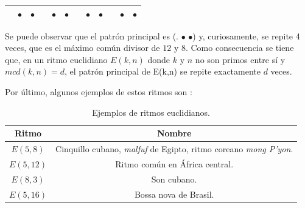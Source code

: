 \documentclass[a4paper, openright, 11pt, titlepage]{report}
\theoremstyle{definition}\newtheorem{defin}[propo]{Definition}
\theoremstyle{definition}\newtheorem{obser}[propo]{Remark}
\theoremstyle{definition}\newtheorem{ejem}[propo]{Ejemplo}
\theoremstyle{definition}\newtheorem{algoritmo}[propo]{Algoritmo}
\begin{document}
\begin{enumerate}
    \begin{table}[H]
        \centering
        \begin{tabular}{|c|c|c|c|c|c|c|c|c|c|c|c|}
        \hline
            & $\bullet$ & $\bullet$ & & $\bullet$ & $\bullet$ & & $\bullet$ & $\bullet$ & &$\bullet$ & $\bullet$\\
            \hline
        \end{tabular}
    \end{table}
    Se puede observar que el patrón principal es (\hspace{0.1cm}. \hspace{0.1cm} $\bullet$ \hspace{0.1cm} $\bullet$) y, curiosamente, se repite 4 veces, que es el máximo común divisor de $12$ y $8$. Como consecuencia se tiene que, en un ritmo euclidiano $E(k,n)$ donde $k$ y $n$ no son primos entre sí y $mcd(k,n) = d$, el patrón principal de E(k,n) se repite exactamente $d$ veces.
\end{enumerate}
Por último, algunos ejemplos de estos ritmos son \cite{ritmos}:
\begin{table}[H]
    \centering
    \begin{tabular}{|c|c|}
    \hline
      Ritmo   &  Nombre\\
      \hline \hline
      $E(5,8)$ & Cinquillo cubano, \textit{malfuf} de Egipto, ritmo coreano \textit{mong P'yon}.\\
      \hline
      $E(5,12)$ & Ritmo común en África central.\\
      \hline
      $E(8,3)$ & Son cubano.\\
      \hline
      $E(5, 16)$ & Bossa nova de Brasil.\\
      \hline
    \end{tabular}
    \caption{Ejemplos de ritmos euclidianos.}
\end{table}
\end{document}
